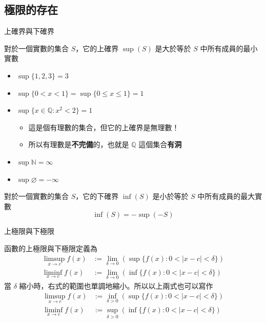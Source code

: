 \documentclass{beamer}
\begin{document}
\begin{CJK}{UTF8}{bsmi}
\subsection{極限的存在}
\begin{frame}{上確界與下確界}
  \begin{definition}
    對於一個實數的集合 $S$，它的上確界 $\sup(S)$ 是大於等於 $S$ 中所有成員的最小實數
  \end{definition}
  \begin{itemize}
    \item $\sup\{1,2,3\} = 3$
    \item $\sup\{0 < x < 1\} = \sup\{0 \le x \le 1\} = 1$
    \item $\sup\{x\in\mathbb{Q}: x^2 < 2\} = 1$
      \begin{itemize}
      \item 這是個有理數的集合，但它的上確界是無理數！
      \item 所以有理數是\textbf{不完備}的，也就是 $\mathbb{Q}$ 這個集合\textbf{有洞}
      \end{itemize}
    \item $\sup\mathbb{N} = \infty$
    \item $\sup\varnothing = -\infty$
  \end{itemize}
  \begin{definition}
    對於一個實數的集合 $S$，它的下確界 $\inf(S)$ 是小於等於 $S$ 中所有成員的最大實數
    \[\inf(S) = -\sup(-S)\]
  \end{definition}
\end{frame}

\begin{frame}{上極限與下極限}
  \begin{definition}
    函數的上極限與下極限定義為
    \begin{align*}
    \limsup_{x \to c} f(x) &:= \lim_{\delta\to0}(\sup\{f(x): 0 < |x-c| < \delta\})\\
    \liminf_{x \to c} f(x) &:= \lim_{\delta\to0}(\inf\{f(x): 0 < |x-c| < \delta\})
    \end{align*}
    當 $\delta$ 縮小時，右式的範圍也單調地縮小。所以以上兩式也可以寫作
    \begin{align*}
    \limsup_{x \to c} f(x) &:= \inf_{\delta>0}(\sup\{f(x): 0 < |x-c| < \delta\})\\
    \liminf_{x \to c} f(x) &:= \sup_{\delta>0}(\inf\{f(x): 0 < |x-c| < \delta\})
    \end{align*}
  \end{definition}
\end{frame}


\end{CJK}
\end{document}
